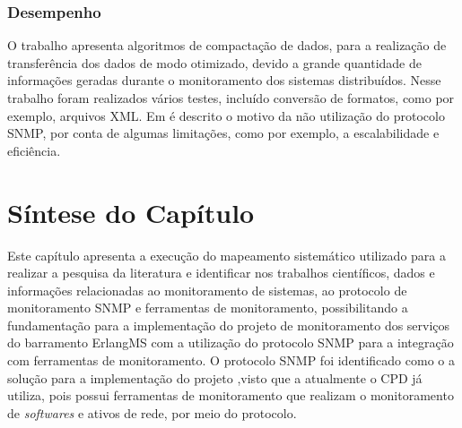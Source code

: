 \subsubsection{Desempenho}

O trabalho \cite{wang2016improvements} apresenta algoritmos de compactação de dados, para a realização de transferência dos dados de modo otimizado, devido a grande quantidade de informações geradas durante o monitoramento dos sistemas distribuídos. Nesse trabalho foram realizados vários testes, incluído conversão de formatos, como por exemplo, arquivos XML. Em \cite{kotsopoulos2008soa} é descrito o motivo da não utilização do protocolo SNMP, por conta de algumas limitações, como por exemplo, a escalabilidade e eficiência. 

\section{Síntese do Capítulo}

Este capítulo apresenta a execução do mapeamento sistemático utilizado para a realizar a pesquisa da literatura e identificar nos trabalhos científicos, dados e informações relacionadas ao monitoramento de sistemas, ao protocolo de monitoramento \acrshort{SNMP} e ferramentas de monitoramento, possibilitando a fundamentação para a implementação do projeto de monitoramento dos serviços do barramento ErlangMS com a utilização do protocolo \acrshort{SNMP} para a integração com ferramentas de monitoramento. O protocolo \acrshort{SNMP} foi identificado como o a solução para a implementação do projeto ,visto que a atualmente o \acrshort{CPD} já utiliza, pois  possui ferramentas de monitoramento que realizam o monitoramento de \textit{softwares} e ativos de rede, por meio do protocolo. 

